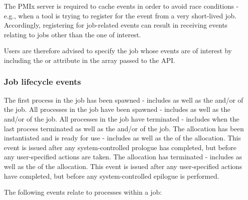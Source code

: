 \adviceuserstart
The \ac{PMIx} server is required to cache events in order to avoid race
conditions - e.g., when a tool is trying to register for the
 event from a very short-lived job. Accordingly,
registering for job-related events can result in receiving events relating to
jobs other than the one of interest.

Users are therefore advised to specify the job whose events are of interest by
including the  or
 attribute in the  array passed
to the  \ac{API}.

\adviceuserend

\subsubsection{Job lifecycle events}

\begin{constantdesc}
%
The first process in the job has been spawned - includes  as well as the  and/or  of the job.
%
All processes in the job have been spawned - includes  as well as the  and/or  of the job.
%
All processes in the job have terminated - includes  when the last process terminated as well as the  and/or  of the job.
%
The allocation has been instantiated and is ready for use - includes  as well as the  of the allocation. This event is issued after any system-controlled prologue has completed, but before any user-specified actions are taken.
%
The allocation has terminated - includes  as well as the  of the allocation. This event is issued after any user-specified actions have completed, but before any system-controlled epilogue is performed.
%
\end{constantdesc}

The following events relate to processes within a job:


